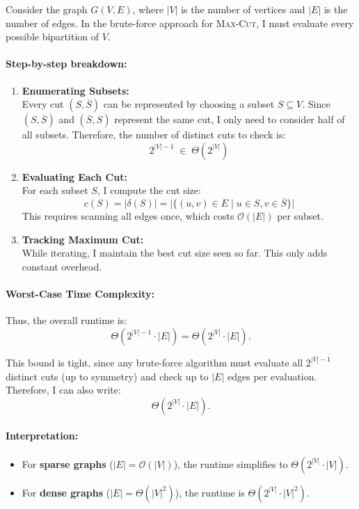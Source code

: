 \documentclass[12pt]{article}
\begin{document}
Consider the graph $G(V,E)$, where $|V|$ is the number of vertices and $|E|$ is the number of edges. In the brute-force approach for \textsc{Max-Cut}, I must evaluate every possible bipartition of $V$.  

\paragraph{Step-by-step breakdown:}

\begin{enumerate}
    \item \textbf{Enumerating Subsets:} \\
    Every cut $(S, \overline{S})$ can be represented by choosing a subset $S \subseteq V$. Since $(S, \overline{S})$ and $(\overline{S}, S)$ represent the same cut, I only need to consider half of all subsets. Therefore, the number of distinct cuts to check is:
    \[
        2^{|V|-1} \;\in\; \Theta(2^{|V|})
    \]

    \item \textbf{Evaluating Each Cut:} \\
    For each subset $S$, I compute the cut size:
    \[
        c(S) = |\delta(S)| = |\{(u,v) \in E \;|\; u \in S, v \in \overline{S}\}|
    \]
    This requires scanning all edges once, which costs $\mathcal{O}(|E|)$ per subset.

    \item \textbf{Tracking Maximum Cut:} \\
    While iterating, I maintain the best cut size seen so far. This only adds constant overhead.
\end{enumerate}

\paragraph{Worst-Case Time Complexity:}

Thus, the overall runtime is:
\[
    \Theta(2^{|V|-1} \cdot |E|) = \Theta(2^{|V|} \cdot |E|).
\]

This bound is tight, since any brute-force algorithm must evaluate all $2^{|V|-1}$ distinct cuts (up to symmetry) and check up to $|E|$ edges per evaluation. Therefore, I can also write:
\[
    \Theta(2^{|V|} \cdot |E|).
\]

\paragraph{Interpretation:}
\begin{itemize}
    \item For \textbf{sparse graphs} ($|E| = \mathcal{O}(|V|)$), the runtime simplifies to $\Theta(2^{|V|} \cdot |V|)$.
    \item For \textbf{dense graphs} ($|E| = \Theta(|V|^2)$), the runtime is $\Theta(2^{|V|} \cdot |V|^2)$.
\end{itemize}
\end{document}
